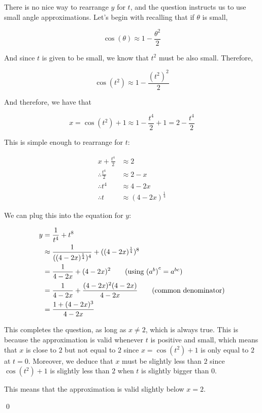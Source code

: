 \begin{solution}
    There is no nice way to rearrange $y$ for $t$, and the question instructs us to use small angle approximations. Let's begin with recalling that if $\theta$ is small,

    \[\cos(\theta) \approx 1 - \frac{\theta^2}{2}\]

    And since $t$ is given to be small, we know that $t^2$ must be also small. Therefore,

    \[\cos(t^2) \approx 1 - \frac{(t^2)^2}{2}\]

    And therefore, we have that 

    \[ x = \cos(t^2) + 1 \approx 1 - \frac{t^4}{2} + 1  = 2 - \frac{t^4}{2}\]
    
    This is simple enough to rearrange for $t$:

    \begin{align*}
        x +   \frac{t^4}{2} &\approx 2 \\
         \therefore \frac{t^4}{2} &\approx 2 - x \\
         \therefore t^4 &\approx 4 - 2x \\
         \therefore t &\approx (4 - 2x)^{\frac{1}{4}}
    \end{align*}

    We can plug this into the equation for $y$:

    \begin{align*}
        y &= \frac{1}{t^4} + t^8 \\
         &\approx \frac{1}{((4 - 2x)^{\frac{1}{4}})^4} + ((4 - 2x)^{\frac{1}{4}})^8 \\
         &= \frac{1}{4 - 2x} + (4 - 2x)^2 \tag{using ${(a^b)}^c = a^{bc}$}\\
         &=\frac{1}{4 - 2x} + \frac{(4 - 2x)^2(4 - 2x)}{4 - 2x} \tag{common denominator}\\
         &=  \frac{1 + (4 - 2x)^3}{4 - 2x}
    \end{align*}

    This completes the question, as long as $x \neq 2$, which is always true. This is because the approximation is valid whenever $t$ is positive and small, which means that $x$ is close to $2$ but not equal to $2$ since $x = \cos(t^2) +1$ is only equal to $2$ at $t = 0$.
    Moreover, we deduce that $x$ must be slightly less than $2$ since $\cos(t^2)+1$ is slightly less than $2$ when $t$ is slightly bigger than $0$. 

    This means that the approximation is valid slightly below $x=2$.

    \qed
\end{solution}

